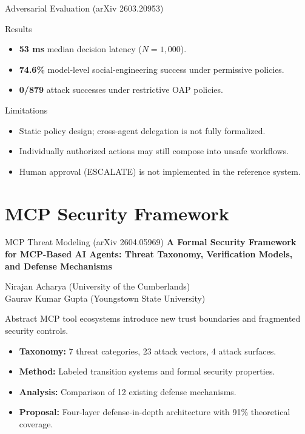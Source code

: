 \documentclass[aspectratio=169]{beamer}
\begin{document}
\begin{frame}{Adversarial Evaluation (arXiv 2603.20953)}
    \begin{block}{Results}
        \begin{itemize}
            \item \textbf{53 ms} median decision latency ($N=1{,}000$).
            \item \textbf{74.6\%} model-level social-engineering success under permissive policies.
            \item \textbf{0/879} attack successes under restrictive OAP policies.
        \end{itemize}
    \end{block}
    \begin{alertblock}{Limitations}
        \begin{itemize}
            \item Static policy design; cross-agent delegation is not fully formalized.
            \item Individually authorized actions may still compose into unsafe workflows.
            \item Human approval (ESCALATE) is not implemented in the reference system.
        \end{itemize}
    \end{alertblock}
\end{frame}

\section{MCP Security Framework}
\begin{frame}{MCP Threat Modeling (arXiv 2604.05969)}
    \footnotesize
    \textbf{A Formal Security Framework for MCP-Based AI Agents: Threat Taxonomy, Verification Models, and Defense Mechanisms}

    {\small Nirajan Acharya (University of the Cumberlands)\\Gaurav Kumar Gupta (Youngstown State University)}
    \begin{block}{Abstract}
        MCP tool ecosystems introduce new trust boundaries and fragmented security controls.
    \end{block}
    \begin{itemize}
        \item \textbf{Taxonomy:} 7 threat categories, 23 attack vectors, 4 attack surfaces.
        \item \textbf{Method:} Labeled transition systems and formal security properties.
        \item \textbf{Analysis:} Comparison of 12 existing defense mechanisms.
        \item \textbf{Proposal:} Four-layer defense-in-depth architecture with 91\% theoretical coverage.
    \end{itemize}
\end{frame}
\end{document}
